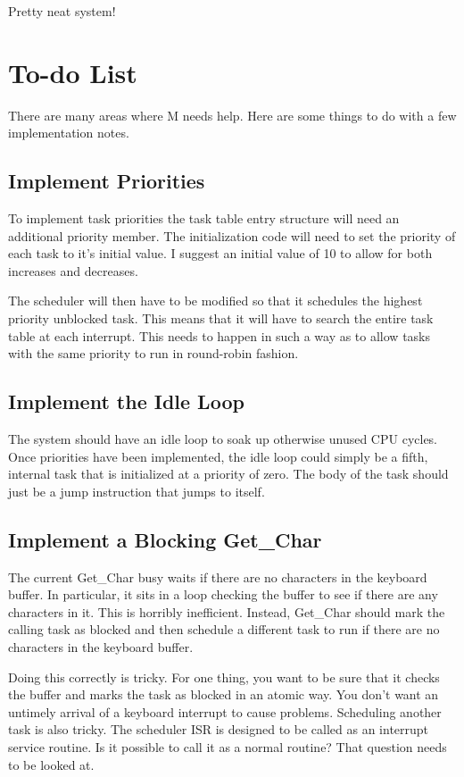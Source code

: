 \documentclass{article}
\begin{document}
Pretty neat system!

\appendix

\section{To-do List}

There are many areas where M needs help. Here are some things to do with a few implementation
notes.

\subsection{Implement Priorities}

To implement task priorities the task table entry structure will need an additional priority
member. The initialization code will need to set the priority of each task to it's initial
value. I suggest an initial value of 10 to allow for both increases and decreases.

The scheduler will then have to be modified so that it schedules the highest priority unblocked
task. This means that it will have to search the entire task table at each interrupt. This needs
to happen in such a way as to allow tasks with the same priority to run in round-robin fashion.

\subsection{Implement the Idle Loop}

The system should have an idle loop to soak up otherwise unused CPU cycles. Once priorities have
been implemented, the idle loop could simply be a fifth, internal task that is initialized at a
priority of zero. The body of the task should just be a jump instruction that jumps to itself.

\subsection{Implement a Blocking Get\_Char}

The current Get\_Char busy waits if there are no characters in the keyboard buffer. In
particular, it sits in a loop checking the buffer to see if there are any characters in it. This
is horribly inefficient. Instead, Get\_Char should mark the calling task as blocked and then
schedule a different task to run if there are no characters in the keyboard buffer.

Doing this correctly is tricky. For one thing, you want to be sure that it checks the buffer and
marks the task as blocked in an atomic way. You don't want an untimely arrival of a keyboard
interrupt to cause problems. Scheduling another task is also tricky. The scheduler ISR is
designed to be called as an interrupt service routine. Is it possible to call it as a normal
routine? That question needs to be looked at.
\end{document}
